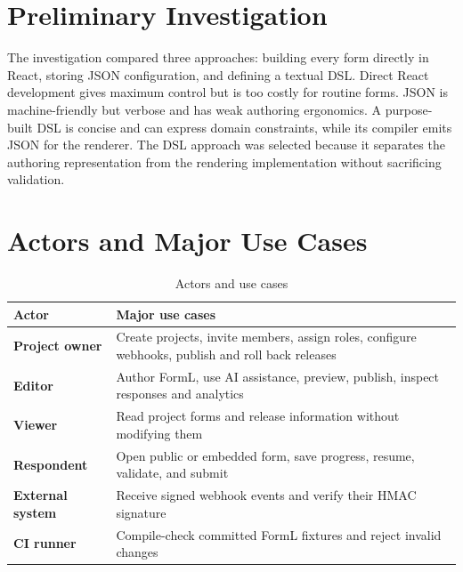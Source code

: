 \documentclass[12pt,a4paper,oneside]{report}
\begin{document}
\section{Preliminary Investigation}
The investigation compared three approaches: building every form directly in React, storing
JSON configuration, and defining a textual DSL. Direct React development gives maximum control
but is too costly for routine forms. JSON is machine-friendly but verbose and has weak
authoring ergonomics. A purpose-built DSL is concise and can express domain constraints, while
its compiler emits JSON for the renderer. The DSL approach was selected because it separates
the authoring representation from the rendering implementation without sacrificing validation.

\section{Actors and Major Use Cases}
\begin{table}[H]
\centering
\caption{Actors and use cases}
\label{tab:actors}
\begin{tabularx}{\textwidth}{>{\bfseries}p{}X}
\toprule
Actor & Major use cases\\
\midrule
Project owner & Create projects, invite members, assign roles, configure webhooks, publish and roll back releases\\
Editor & Author FormL, use AI assistance, preview, publish, inspect responses and analytics\\
Viewer & Read project forms and release information without modifying them\\
Respondent & Open public or embedded form, save progress, resume, validate, and submit\\
External system & Receive signed webhook events and verify their HMAC signature\\
CI runner & Compile-check committed FormL fixtures and reject invalid changes\\
\bottomrule
\end{tabularx}
\end{table}
\end{document}

